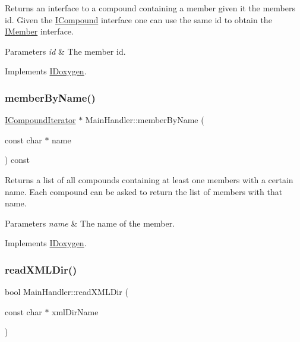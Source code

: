 Returns an interface to a compound containing a member given it the member\textquotesingle{}s id. Given the \mbox{\hyperlink{class_i_compound}{I\+Compound}} interface one can use the same id to obtain the \mbox{\hyperlink{class_i_member}{I\+Member}} interface. 
\begin{DoxyParams}{Parameters}
{\em id} & The member id. \\
\hline
\end{DoxyParams}


Implements \mbox{\hyperlink{class_i_doxygen_ac7544d8d1dd53c3a8d1e180d81bca0e9}{I\+Doxygen}}.

\mbox{\label{class_main_handler_a1fe4393d8d5c1c3d95d3a233ab80417a}} 
\subsubsection{\texorpdfstring{memberByName()}{memberByName()}}
{\footnotesize\ttfamily \mbox{\hyperlink{class_i_compound_iterator}{I\+Compound\+Iterator}} $\ast$ Main\+Handler\+::member\+By\+Name (\begin{DoxyParamCaption}\item[{const char $\ast$}]{name }\end{DoxyParamCaption}) const\hspace{0.3cm}{\ttfamily [virtual]}}

Returns a list of all compounds containing at least one members with a certain name. Each compound can be asked to return the list of members with that name. 
\begin{DoxyParams}{Parameters}
{\em name} & The name of the member. \\
\hline
\end{DoxyParams}


Implements \mbox{\hyperlink{class_i_doxygen_a1895a0347469d6e4788da0beca0e071c}{I\+Doxygen}}.

\mbox{\label{class_main_handler_a09e7e0c5e69be2b2aa5dc91cb77721d8}} 
\subsubsection{\texorpdfstring{readXMLDir()}{readXMLDir()}}
{\footnotesize\ttfamily bool Main\+Handler\+::read\+X\+M\+L\+Dir (\begin{DoxyParamCaption}\item[{const char $\ast$}]{xml\+Dir\+Name }\end{DoxyParamCaption})\hspace{0.3cm}{\ttfamily [virtual]}}

